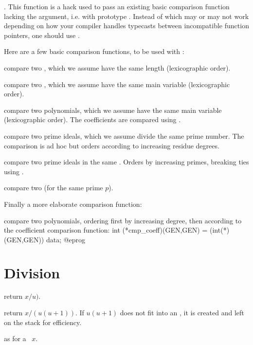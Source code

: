 . This function is a hack
used to pass an existing basic comparison function lacking the 
argument, i.e. with prototype . Instead of
 which may or may not work depending on how your
compiler handles typecasts between incompatible function pointers, one should
use .

Here are a few basic comparison functions, to be used with :

 compare two , which we assume have
the same length (lexicographic order).

 compare two , which we assume
have the same main variable (lexicographic order).

 compare two polynomials, which we assume
have the same main variable (lexicographic order). The coefficients are
compared using .

 compare two prime ideals, which
we assume divide the same prime number. The comparison is ad hoc but orders
according to increasing residue degrees.

 compare two prime ideals in the same
. Orders by increasing primes, breaking ties using
.

 compare two  (for the same
prime $p$).

Finally a more elaborate comparison function:

 compare two polynomials,
ordering first by increasing degree, then according to the coefficient
comparison function:
\bprog
  int (*cmp_coeff)(GEN,GEN) = (int(*)(GEN,GEN)) data;
@eprog

\section{Division}

 return $x/u)$.

 return $x/(u(u+1))$. If $u(u+1)$
does not fit into an , it is created and left on the stack for efficiency.

 as  for a
~$x$.

